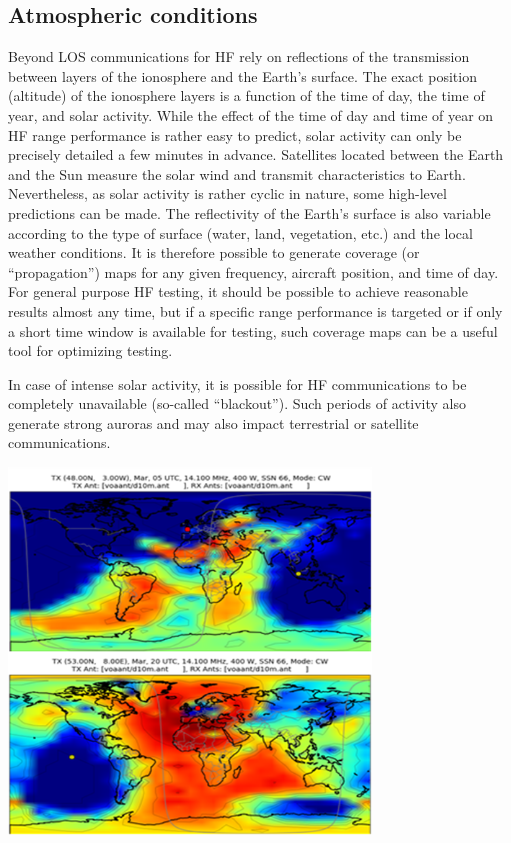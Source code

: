 \documentclass[
]{book}
\begin{document}
\hypertarget{atmospheric-conditions}{%
\subsection{Atmospheric conditions}\label{atmospheric-conditions}}

Beyond LOS communications for HF rely on reflections of the transmission
between layers of the ionosphere and the Earth's surface. The exact position
(altitude) of the ionosphere layers is a function of the time of day, the time
of year, and solar activity. While the effect of the time of day and time of
year on HF range performance is rather easy to predict, solar activity can only
be precisely detailed a few minutes in advance. Satellites located between the
Earth and the Sun measure the solar wind and transmit characteristics to Earth.
Nevertheless, as solar activity is rather cyclic in nature, some high-level
predictions can be made. The reflectivity of the Earth's surface is also
variable according to the type of surface (water, land, vegetation, etc.) and
the local weather conditions. It is therefore possible to generate coverage (or
``propagation'') maps for any given frequency, aircraft position, and time of
day. For general purpose HF testing, it should be possible to achieve
reasonable results almost any time, but if a specific range performance is
targeted or if only a short time window is available for testing, such coverage
maps can be a useful tool for optimizing testing.

In case of intense solar activity, it is possible for HF communications to be
completely unavailable (so-called ``blackout''). Such periods of activity also
generate strong auroras and may also impact terrestrial or satellite
communications.

\includegraphics[width=3.79245in,height=3.83744in]{media/20/image6.png}
\end{document}
